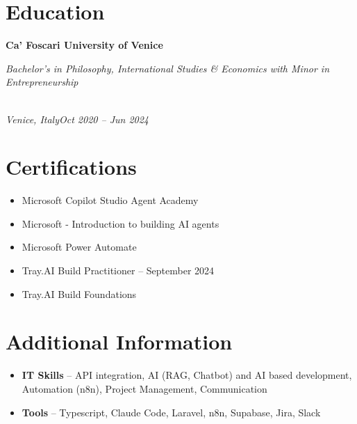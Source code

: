 \documentclass[a4paper,10pt]{article}
\newcommand{\role}[4]{\vspace{3pt}\noindent\hspace{0.6em}\parbox[t]{0.38\textwidth}{\raggedright\textbf{#1}}\hfill\parbox[t]{0.58\textwidth}{\raggedleft\textit{#2}}\\{\textit{#3}\hfill\textit{#4}}\vspace{1pt}}
\begin{document}
\section{Education}
\role{Ca' Foscari University of Venice}{Bachelor's in Philosophy, International Studies \& Economics with Minor in Entrepreneurship}{Venice, Italy}{Oct 2020 -- Jun 2024}

\section{Certifications}
\begin{itemize}
\item Microsoft Copilot Studio Agent Academy
\item Microsoft - Introduction to building AI agents
\item Microsoft Power Automate
\item Tray.AI Build Practitioner -- September 2024
\item Tray.AI Build Foundations
\end{itemize}

\section{Additional Information}
\begin{itemize}
\item \textbf{IT Skills} -- API integration, AI (RAG, Chatbot) and AI based development, Automation (n8n), Project Management, Communication
\item \textbf{Tools} -- Typescript, Claude Code, Laravel, n8n, Supabase, Jira, Slack
\end{itemize}
\end{document}
